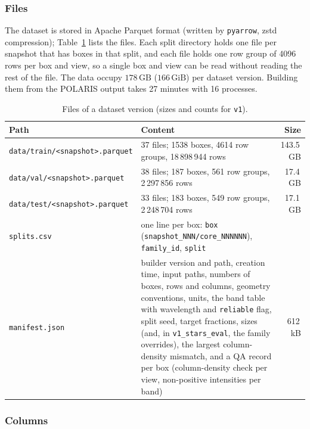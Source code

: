\subsubsection{Files}

The dataset is stored in Apache Parquet format (written by \texttt{pyarrow}, zstd compression); Table~\ref{tab:files}
lists the files. Each split directory holds one file per snapshot that has boxes in that split, and each file holds
one row group of 4096 rows per box and view, so a single box and view can be read without reading the rest of the
file. The data occupy $178\,\mathrm{GB}$ ($166\,\mathrm{GiB}$) per dataset version. Building them from the
POLARIS output takes 27 minutes with 16 processes.

\begin{table}[ht]
  \centering
  \caption{Files of a dataset version (sizes and counts for \texttt{v1}).}
  \label{tab:files}
  \small
  \begin{tabular}{@{}p{}p{}r@{}}
    \toprule
    Path & Content & Size \\
    \midrule
    \texttt{data/train/<snapshot>.parquet} & 37 files; 1538 boxes, 4614 row groups, 18\,898\,944 rows & 143.5\,GB \\
    \texttt{data/val/<snapshot>.parquet}   & 38 files; 187 boxes, 561 row groups, 2\,297\,856 rows & 17.4\,GB \\
    \texttt{data/test/<snapshot>.parquet}  & 33 files; 183 boxes, 549 row groups, 2\,248\,704 rows & 17.1\,GB \\
    \texttt{splits.csv} & one line per box: \texttt{box} (\texttt{snapshot\_NNN/core\_NNNNNN}), \texttt{family\_id}, \texttt{split} & \\
    \texttt{manifest.json} & builder version and path, creation time, input paths, numbers of boxes, rows and columns,
      geometry conventions, units, the band table with wavelength and \texttt{reliable} flag, split seed, target fractions,
      sizes (and, in \texttt{v1\_stars\_eval}, the family overrides), the largest column-density mismatch, and a QA record per box
      (column-density check per view, non-positive intensities per band) & 612\,kB \\
    \bottomrule
  \end{tabular}
\end{table}

\subsubsection{Columns}

